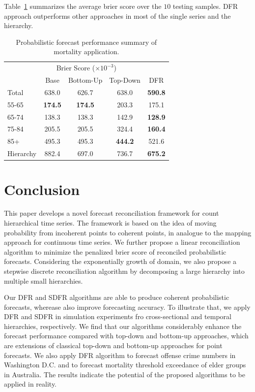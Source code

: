 \documentclass[a4paper,review,12pt,authoryear]{elsarticle}
\begin{document}
Table~\ref{tab:mortality_age} summarizes the average brier score over the $10$ testing samples. 
DFR approach outperforms other approaches in most of the single series and the hierarchy. 


\begin{table}
  \centering
  \caption{\label{tab:mortality_age} Probabilistic forecast performance summary of mortality application.}
  \begin{tabular}{lcccc}
  \toprule
  \multicolumn{5}{c}{Brier Score ($\times 10^{-3}$)}\\ 
  & Base & Bottom-Up & Top-Down & DFR \\\midrule
  Total & 638.0 & 626.7 & 638.0 & \textbf{590.8} \\
  55-65 & \textbf{174.5} & \textbf{174.5} & 203.3 & 175.1 \\
  65-74 & 138.3 & 138.3 & 142.9 & \textbf{128.9}\\
  75-84 & 205.5 & 205.5 & 324.4 & \textbf{160.4}\\
  85+ & 495.3 & 495.3 & \textbf{444.2} & 521.6\\
  Hierarchy & 882.4 & 697.0 & 736.7 & \textbf{675.2} \\
  \bottomrule
 \end{tabular}
\end{table}

\section{Conclusion}
\label{sec:conclusion}

This paper develops a novel forecast reconciliation framework for count hierarchical time series. 
The framework is based on the idea of moving probability from incoherent points to coherent points, in analogue to the mapping approach for continuous time series.
We further propose a linear reconciliation algorithm to minimize the penalized brier score of reconciled probabilistic forecasts.
Considering the exponentially growth of domain, we also propose a stepwise discrete reconciliation algorithm by decomposing a large hierarchy into multiple small hierarchies.

Our DFR and SDFR algorithms are able to produce coherent probabilistic forecasts, wherease also improve forecasting accuracy. 
To illustrate that, we apply DFR and SDFR in simulation experiments fro cross-sectional and temporal hierarchies, respectively.
We find that our algorithms considerably enhance the forecast performance compared with  top-down and bottom-up approaches, which are extensions of classical top-down and bottom-up approaches for point forecasts.
We also apply DFR algorithm to forecast offense crime numbers in Washington D.C. and to forecast mortality threshold exceedance of elder groups in Australia. 
The results indicate the potential of the proposed algorithms to be applied in reality.
\end{document}
